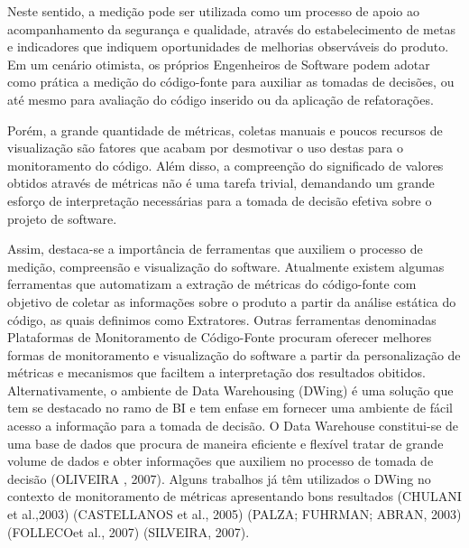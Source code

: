%

Neste sentido, a medição pode ser utilizada como um processo de apoio ao acompanhamento da segurança e qualidade, através do estabelecimento de metas e indicadores que indiquem oportunidades de melhorias observáveis do produto. Em um cenário otimista, os próprios Engenheiros de Software podem adotar como prática a medição do código-fonte para auxiliar as tomadas de decisões, ou até mesmo para avaliação do código inserido ou da aplicação de refatorações.


Porém, a grande quantidade de métricas, coletas manuais e poucos recursos de visualização são fatores que acabam por desmotivar o uso destas para o monitoramento do código. Além disso, a compreenção do significado de valores obtidos através de métricas não é uma tarefa trivial, demandando um grande esforço de interpretação necessárias para a tomada de decisão efetiva sobre o projeto de software.

%

Assim, destaca-se a importância de ferramentas que auxiliem o processo de medição, compreensão e visualização do software. Atualmente existem algumas ferramentas que automatizam a extração de métricas do código-fonte com objetivo de coletar as informações sobre o produto a partir da análise estática do código, as quais definimos como Extratores. Outras ferramentas denominadas Plataformas de Monitoramento de Código-Fonte procuram oferecer melhores formas de monitoramento e visualização do software a partir da personalização de métricas e mecanismos que faciltem a interpretação dos resultados obitidos. Alternativamente, o ambiente de Data Warehousing (DWing) é uma solução que tem se destacado no ramo de BI e tem enfase em fornecer uma ambiente de fácil acesso a informação para a tomada de decisão. O Data Warehouse constitui-se de uma base de dados que procura de maneira eficiente e flexível tratar de grande volume de dados e obter informações que auxiliem no processo de tomada de decisão (OLIVEIRA , 2007). Alguns trabalhos já têm utilizados o DWing no contexto de monitoramento de métricas apresentando bons resultados (CHULANI et al.,2003) (CASTELLANOS et al., 2005) (PALZA; FUHRMAN; ABRAN, 2003) (FOLLECOet al., 2007) (SILVEIRA, 2007).

%

